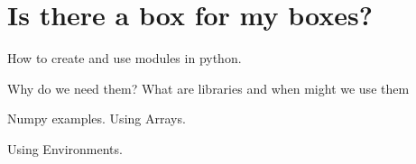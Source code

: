 \section{Is there a box for my boxes?} \label{sec:Modules}

How to create and use modules in python.

Why do we need them?
What are libraries and when might we use them

Numpy examples. Using Arrays.

Using Environments.